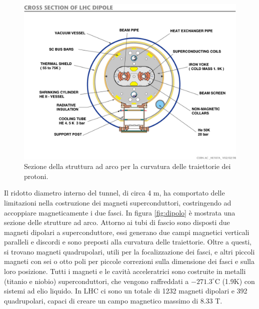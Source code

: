 \begin{figure}[!htb]
  \centering
    \includegraphics[width=.75\textwidth]{figures/LHC-magnets.jpg}
  \caption{Sezione della struttura ad arco per la curvatura delle traiettorie dei protoni.}
  \label{fig:LHC_dipole}
\end{figure}

\noindent Il ridotto diametro interno del tunnel, di circa 4 m, ha comportato delle limitazioni nella costruzione dei magneti superconduttori, costringendo ad accoppiare magneticamente i due fasci. In figura \ref{fig:dipolo} \`e mostrata una sezione delle strutture ad arco. Attorno ai tubi di fascio sono disposti due magneti dipolari a superconduttore, essi generano due campi magnetici verticali paralleli e discordi e sono preposti alla curvatura delle traiettorie. Oltre a questi, si trovano magneti quadrupolari, utili per la focalizzazione dei fasci, e altri piccoli magneti con sei o otto poli per piccole correzioni sulla dimensione dei fasci e sulla loro posizione. Tutti i magneti e le cavit\`a acceleratrici sono costruite in metalli (titanio e niobio) superconduttori, che vengono raffreddati a $-271.3^{\circ}$C (1.9K) con sistemi ad elio liquido. In LHC ci sono un totale di 1232 magneti dipolari e 392 quadrupolari, capaci di creare un campo magnetico massimo di 8.33 T.

